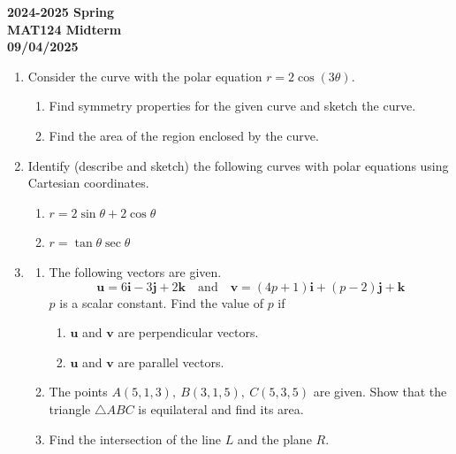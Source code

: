 \documentclass[a4paper, 12pt]{article}
\begin{document}
\newpage
{}
{}
\begin{center}
\textbf{2024-2025 Spring \\MAT124 Midterm\\09/04/2025}
\end{center}

\begin{enumerate}[leftmargin=*,label=\textbf{\arabic*.}]
\item Consider the curve with the polar equation $r=2\cos(3\theta)$.

\begin{enumerate}[leftmargin=*,label=\textbf{\alph*.}]
\item Find symmetry properties for the given curve and sketch the curve.
\item Find the area of the region enclosed by the curve.
\end{enumerate}

\item Identify (describe and sketch) the following curves with polar equations using Cartesian coordinates.
\begin{enumerate}[leftmargin=*,label=\textbf{\alph*.}]
\item $r=2\sin\theta +2\cos\theta$
\item $r=\tan\theta\sec\theta$
\end{enumerate}

\item \begin{enumerate}[leftmargin=*,label=\textbf{\alph*.}]
\item The following vectors are given.
\[\mathbf{u}=6\mathbf{i}-3\mathbf{j}+2\mathbf{k}\quad\text{and}\quad\mathbf{v}=(4{p}+1)\mathbf{i}+({p}-2)\mathbf{j}+\mathbf{k}\]
${p}$ is a scalar constant. Find the value of ${p}$ if
\begin{enumerate}[leftmargin=*,label=\textbf{\roman*.}]
\item $\mathbf{u}$ and $\mathbf{v}$ are perpendicular vectors. 
\item $\mathbf{u}$ and $\mathbf{v}$ are parallel vectors.
\end{enumerate}

\item The points $A(5,1,3),\:B(3,1,5),\:C(5,3,5)$ are given. Show that the triangle $\triangle{ABC}$ is equilateral and find its area.

\item Find the intersection of the line $L$ and the plane $R$.


\end{enumerate}
\end{enumerate}
\end{document}
